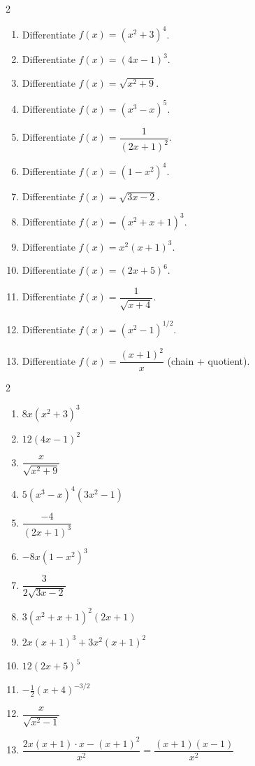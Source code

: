 \documentclass[11pt]{article}
\begin{document}
\begin{recapbox}
\begin{multicols}{2}
\small
\begin{enumerate}[leftmargin=*,itemsep=3pt]
  \item Differentiate $f(x)=(x^2+3)^4$.
  \item Differentiate $f(x)=(4x-1)^3$.
  \item Differentiate $f(x)=\sqrt{x^2+9}$.
  \item Differentiate $f(x)=(x^3-x)^5$.
  \item Differentiate $f(x)=\dfrac1{(2x+1)^2}$.
  \item Differentiate $f(x)=(1-x^2)^4$.
  \item Differentiate $f(x)=\sqrt{3x-2}$.
  \item Differentiate $f(x)=(x^2+x+1)^3$.
  \item Differentiate $f(x)=x^2(x+1)^3$.
  \item Differentiate $f(x)=(2x+5)^6$.
  \item Differentiate $f(x)=\dfrac{1}{\sqrt{x+4}}$.
  \item Differentiate $f(x)=(x^2-1)^{1/2}$.
  \item Differentiate $f(x)=\dfrac{(x+1)^2}{x}$ (chain + quotient).
\end{enumerate}
\end{multicols}
\end{recapbox}

\begin{keybox}
\begin{multicols}{2}
\small
\begin{enumerate}[leftmargin=*,itemsep=3pt]
  \item $8x(x^2+3)^3$
  \item $12(4x-1)^2$
  \item $\dfrac{x}{\sqrt{x^2+9}}$
  \item $5(x^3-x)^4(3x^2-1)$
  \item $\dfrac{-4}{(2x+1)^3}$
  \item $-8x(1-x^2)^3$
  \item $\dfrac3{2\sqrt{3x-2}}$
  \item $3(x^2+x+1)^2(2x+1)$
  \item $2x(x+1)^3+3x^2(x+1)^2$
  \item $12(2x+5)^5$
  \item $-\tfrac12(x+4)^{-3/2}$
  \item $\dfrac{x}{\sqrt{x^2-1}}$
  \item $\dfrac{2x(x+1)\cdot x-(x+1)^2}{x^2}=\dfrac{(x+1)(x-1)}{x^2}$
\end{enumerate}
\end{multicols}
\end{keybox}
\end{document}
